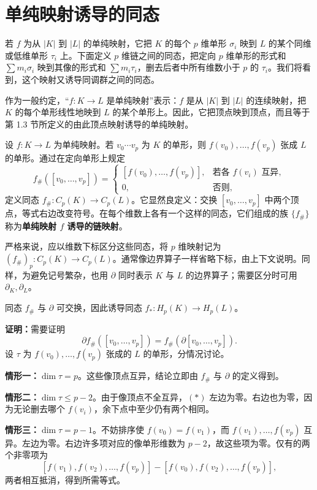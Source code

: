 \section{单纯映射诱导的同态}
若 $f$ 为从 $|K|$ 到 $|L|$ 的单纯映射，它把 $K$ 的每个 $p$ 维单形 $\sigma_i$ 映到 $L$ 的某个同维或低维单形 $\tau_i$ 上。下面定义 $p$ 维链之间的同态，把定向 $p$ 维单形的形式和 $\sum m_i\sigma_i$ 映到其像的形式和 $\sum m_i\tau_i$，删去后者中所有维数小于 $p$ 的 $\tau_i$。我们将看到，这个映射又诱导同调群之间的同态。

作为一般约定，“$f:K\to L$ 是单纯映射”表示：$f$ 是从 $|K|$ 到 $|L|$ 的连续映射，把 $K$ 的每个单形线性地映到 $L$ 的某个单形上。因此，它把顶点映到顶点，而且等于第 1.3 节所定义的由此顶点映射诱导的单纯映射。

设 $f:K\to L$ 为单纯映射。若 $v_0\cdots v_p$ 为 $K$ 的单形，则 $f(v_0),\ldots,f(v_p)$ 张成 $L$ 的单形。通过在定向单形上规定
\[
f_\#([v_0,\ldots,v_p])=
\begin{cases}
[f(v_0),\ldots,f(v_p)],&\text{若各 }f(v_i)\text{ 互异},\\
0,&\text{否则},
\end{cases}
\]
定义同态 $f_\#:C_p(K)\to C_p(L)$。它显然良定义：交换 $[v_0,\ldots,v_p]$ 中两个顶点，等式右边改变符号。在每个维数上各有一个这样的同态，它们组成的族 $\{f_\#\}$ 称为\textbf{单纯映射 $f$ 诱导的链映射}。

严格来说，应以维数下标区分这些同态，将 $p$ 维映射记为 $(f_\#)_p:C_p(K)\to C_p(L)$。通常像边界算子一样省略下标，由上下文说明。同样，为避免记号繁杂，也用 $\partial$ 同时表示 $K$ 与 $L$ 的边界算子；需要区分时可用 $\partial_K,\partial_L$。

同态 $f_\#$ 与 $\partial$ 可交换，因此诱导同态 $f_*:H_p(K)\to H_p(L)$。

\noindent\textbf{证明：}需要证明
\[
\partial f_\#([v_0,\ldots,v_p])=f_\#(\partial[v_0,\ldots,v_p]).\tag{$*$}
\]
设 $\tau$ 为 $f(v_0),\ldots,f(v_p)$ 张成的 $L$ 的单形，分情况讨论。

\textbf{情形一：}$\dim\tau=p$。这些像顶点互异，结论立即由 $f_\#$ 与 $\partial$ 的定义得到。

\textbf{情形二：}$\dim\tau\leq p-2$。由于像顶点不全互异，$(*)$ 左边为零。右边也为零，因为无论删去哪个 $f(v_i)$，余下点中至少仍有两个相同。

\textbf{情形三：}$\dim\tau=p-1$。不妨排序使 $f(v_0)=f(v_1)$，而 $f(v_1),\ldots,f(v_p)$ 互异。左边为零。右边许多项对应的像单形维数为 $p-2$，故这些项为零。仅有的两个非零项为
\[
[f(v_1),f(v_2),\ldots,f(v_p)]-[f(v_0),f(v_2),\ldots,f(v_p)],
\]
两者相互抵消，得到所需等式。

